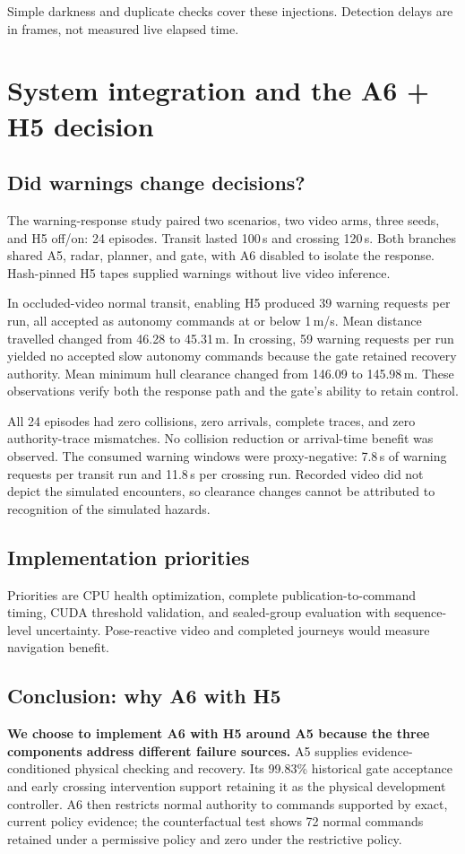 \documentclass[sigconf,nonacm]{acmart}
\begin{document}
Simple darkness and duplicate checks cover these injections. Detection delays are in frames, not measured live elapsed time.



\section{System integration and the A6 + H5 decision}

\subsection{Did warnings change decisions?}
The warning-response study paired two scenarios, two video arms, three seeds, and H5 off/on: 24 episodes. Transit lasted 100\,s and crossing 120\,s. Both branches shared A5, radar, planner, and gate, with A6 disabled to isolate the response. Hash-pinned H5 tapes supplied warnings without live video inference.

In occluded-video normal transit, enabling H5 produced 39 warning requests per run, all accepted as autonomy commands at or below 1\,m/s. Mean distance travelled changed from 46.28 to 45.31\,m. In crossing, 59 warning requests per run yielded no accepted slow autonomy commands because the gate retained recovery authority. Mean minimum hull clearance changed from 146.09 to 145.98\,m. These observations verify both the response path and the gate's ability to retain control.

All 24 episodes had zero collisions, zero arrivals, complete traces, and zero authority-trace mismatches. No collision reduction or arrival-time benefit was observed. The consumed warning windows were proxy-negative: 7.8\,s of warning requests per transit run and 11.8\,s per crossing run. Recorded video did not depict the simulated encounters, so clearance changes cannot be attributed to recognition of the simulated hazards.


\subsection{Implementation priorities}
Priorities are CPU health optimization, complete publication-to-command timing, CUDA threshold validation, and sealed-group evaluation with sequence-level uncertainty. Pose-reactive video and completed journeys would measure navigation benefit.

\subsection{Conclusion: why A6 with H5}
\textbf{We choose to implement A6 with H5 around A5 because the three components address different failure sources.} A5 supplies evidence-conditioned physical checking and recovery. Its 99.83\% historical gate acceptance and early crossing intervention support retaining it as the physical development controller. A6 then restricts normal authority to commands supported by exact, current policy evidence; the counterfactual test shows 72 normal commands retained under a permissive policy and zero under the restrictive policy.
\end{document}
